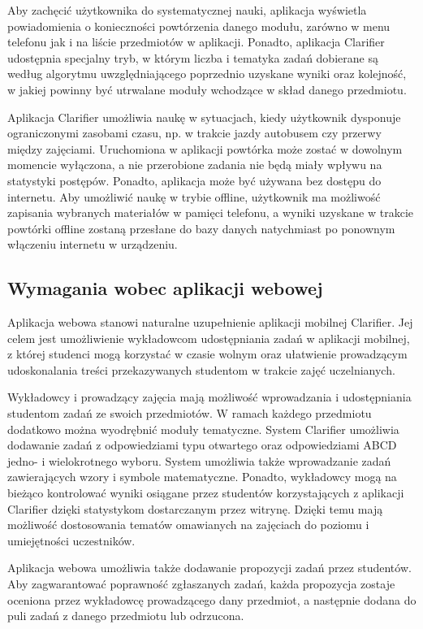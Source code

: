 \documentclass{pracamgr}
\begin{document}
Aby zachęcić użytkownika do systematycznej nauki, aplikacja wyświetla powiadomienia o konieczności powtórzenia danego modułu, zarówno w menu telefonu jak i na liście przedmiotów w aplikacji. Ponadto, aplikacja Clarifier udostępnia specjalny tryb, w którym liczba i tematyka zadań dobierane są według algorytmu uwzględniającego poprzednio uzyskane wyniki oraz kolejność, w jakiej powinny być utrwalane moduły wchodzące w skład danego przedmiotu.  

Aplikacja Clarifier umożliwia naukę w sytuacjach, kiedy użytkownik dysponuje ograniczonymi zasobami czasu, np. w trakcie jazdy autobusem czy przerwy między zajęciami. Uruchomiona w aplikacji powtórka może zostać w dowolnym momencie wyłączona, a nie przerobione zadania nie będą miały wpływu na statystyki postępów. Ponadto, aplikacja może być używana bez dostępu do internetu. Aby umożliwić naukę w trybie offline, użytkownik ma możliwość zapisania wybranych materiałów w pamięci telefonu, a wyniki uzyskane w trakcie powtórki offline zostaną przesłane do bazy danych natychmiast po ponownym włączeniu internetu w urządzeniu.

\subsection{Wymagania wobec aplikacji webowej}
Aplikacja webowa stanowi naturalne uzupełnienie aplikacji mobilnej Clarifier. Jej celem jest umożliwienie wykładowcom udostępniania zadań w aplikacji mobilnej, z której studenci mogą korzystać w czasie wolnym oraz ułatwienie prowadzącym udoskonalania treści przekazywanych studentom w trakcie zajęć uczelnianych. 

Wykładowcy i prowadzący zajęcia mają możliwość wprowadzania i udostępniania studentom zadań ze swoich przedmiotów. W ramach każdego przedmiotu dodatkowo można wyodrębnić moduły tematyczne. System Clarifier umożliwia dodawanie zadań z odpowiedziami typu otwartego oraz odpowiedziami ABCD jedno- i wielokrotnego wyboru. System umożliwia także wprowadzanie zadań zawierających wzory i symbole matematyczne. Ponadto, wykładowcy mogą na bieżąco kontrolować wyniki osiągane przez studentów korzystających z aplikacji Clarifier dzięki statystykom dostarczanym przez witrynę. Dzięki temu mają możliwość dostosowania tematów omawianych na zajęciach do poziomu i umiejętności uczestników.

Aplikacja webowa umożliwia także dodawanie propozycji zadań przez studentów. Aby zagwarantować poprawność zgłaszanych zadań, każda propozycja zostaje oceniona przez wykładowcę prowadzącego dany przedmiot, a następnie dodana do puli zadań z danego przedmiotu lub odrzucona.
\end{document}
